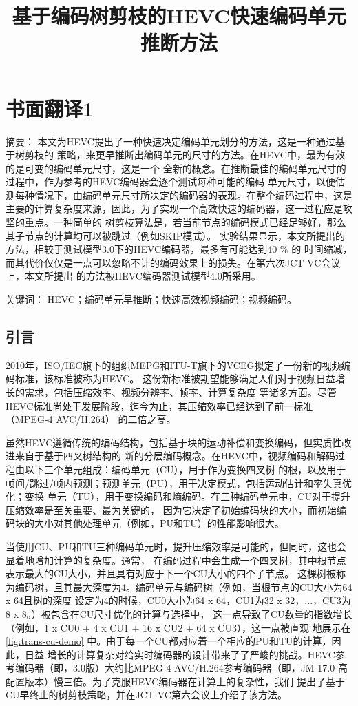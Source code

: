 \chapter{书面翻译1}

\title{基于编码树剪枝的HEVC快速编码单元推断方法}

{\heiti 摘要：} 本文为HEVC提出了一种快速决定编码单元划分的方法，这是一种通过基于树剪枝的
策略，来更早推断出编码单元的尺寸的方法。在HEVC中，最为有效的是可变的编码单元尺寸，这是一个
全新的概念。在推断最佳的编码单元尺寸的过程中，作为参考的HEVC编码器会逐个测试每种可能的编码
单元尺寸，以便估测每种情况下，由编码单元尺寸所决定的编码器的表现。在整个编码过程中，这是
主要的计算复杂度来源，因此，为了实现一个高效快速的编码器，这一过程应是攻坚的重点。一种简单的
树剪枝算法是，若当前节点的编码模式已经足够好，那么其子节点的计算均可以被跳过（例如SKIP模式）。
实验结果显示，本文所提出的方法，相较于测试模型3.0下的HEVC编码器，最多有可能达到40 \% 的
时间缩减，而其代价仅仅是一点可以忽略不计的编码效果上的损失。在第六次JCT-VC会议上，本文所提出
的方法被HEVC编码器测试模型4.0所采用。

{\heiti 关键词：} HEVC；编码单元早推断；快速高效视频编码；视频编码。

\section{引言}

2010年，ISO/IEC旗下的组织MEPG和ITU-T旗下的VCEG拟定了一份新的视频编码标准，该标准被称为HEVC。
这份新标准被期望能够满足人们对于视频日益增长的需求，包括压缩效率、视频分辨率、帧率、计算复杂度
等诸多方面。尽管HEVC标准尚处于发展阶段，迄今为止，其压缩效率已经达到了前一标准（MPEG-4 AVC/H.264）
的二倍之高。

虽然HEVC遵循传统的编码结构，包括基于块的运动补偿和变换编码，但实质性改进来自于基于四叉树结构的
新的分层编码概念。在HEVC中，视频编码和解码过程由以下三个单元组成：编码单元（CU），用于作为变换四叉树
的根，以及用于帧间/跳过/帧内预测；预测单元（PU），用于决定模式，包括运动估计和率失真优化；变换
单元（TU），用于变换编码和熵编码。在三种编码单元中，CU对于提升压缩效率是至关重要、最为关键的，
因为它决定了初始编码块的大小，而初始编码块的大小对其他处理单元（例如，PU和TU）的性能影响很大。

当使用CU、PU和TU三种编码单元时，提升压缩效率是可能的，但同时，这也会显着地增加计算的复杂度。通常，
在编码过程中会生成一个四叉树，其中根节点表示最大的CU大小，并且具有对应于下一个CU大小的四个子节点。
这棵树被称为编码树，且其最大深度为4。编码单元与编码树（例如，当根节点的CU大小为64 x 64且树的深度
设定为4的时候，CU0大小为64 x 64，CU1为32 x 32，...，CU3为8 x 8。）被包含在CU尺寸优化的计算与选择中，
这一点导致了CU数量的指数增长（例如，1 x CU0 + 4 x CU1 + 16 x CU2 + 64 x CU3），这一点被直观
地展示在 \ref {fig:trans-cu-demo} 中。由于每一个CU都对应着一个相应的PU和TU的计算，因此，日益
增长的计算复杂对给实时编码器的设计带来了了严峻的挑战。HEVC参考编码器（即，3.0版）大约比MPEG-4 
AVC/H.264参考编码器（即，JM 17.0 高配置版本）慢三倍。为了克服HEVC编码器在计算上的复杂性，我们
提出了基于CU早终止的树剪枝策略，并在JCT-VC第六会议上介绍了该方法。


